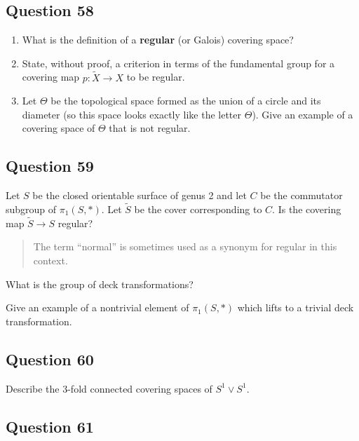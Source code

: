 \documentclass[12pt]{article}
\begin{document}
\hypertarget{question-58-3}{%
\subsection{Question 58}\label{question-58-3}}

\begin{enumerate}
\def\labelenumi{\alph{enumi}.}
\item
  What is the definition of a \textbf{regular} (or Galois) covering
  space?
\item
  State, without proof, a criterion in terms of the fundamental group
  for a covering map \(p : \tilde X \to X\) to be regular.
\item
  Let \(\Theta\) be the topological space formed as the union of a
  circle and its diameter (so this space looks exactly like the letter
  \(\Theta\)). Give an example of a covering space of \(\Theta\) that is
  not regular.
\end{enumerate}

\hypertarget{question-59-3}{%
\subsection{Question 59}\label{question-59-3}}

Let \(S\) be the closed orientable surface of genus 2 and let \(C\) be
the commutator subgroup of \(\pi_1 (S, \ast)\). Let \(\tilde S\) be the
cover corresponding to \(C\). Is the covering map \(\tilde S \to S\)
regular?

\begin{quote}
The term ``normal'' is sometimes used as a synonym for regular in this
context.
\end{quote}

What is the group of deck transformations?

Give an example of a nontrivial element of \(\pi_1 (S, \ast)\) which
lifts to a trivial deck transformation.

\hypertarget{question-60-3}{%
\subsection{Question 60}\label{question-60-3}}

Describe the 3-fold connected covering spaces of \(S^1 \lor S^1\).

\hypertarget{question-61-3}{%
\subsection{Question 61}\label{question-61-3}}
\end{document}
